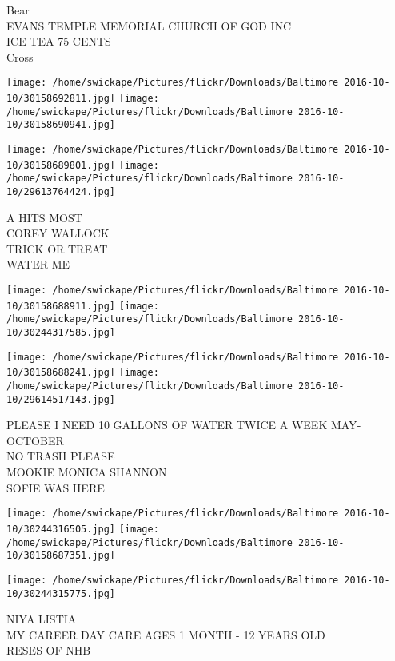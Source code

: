 \documentclass[10pt,letterpaper]{article}
\begin{document}
Bear\\
EVANS TEMPLE MEMORIAL CHURCH OF GOD INC\\
ICE TEA 75 CENTS\\
Cross\\
\pagebreak

\texttt{[image: /home/swickape/Pictures/flickr/Downloads/Baltimore 2016-10-10/30158692811.jpg]}
\texttt{[image: /home/swickape/Pictures/flickr/Downloads/Baltimore 2016-10-10/30158690941.jpg]}

\texttt{[image: /home/swickape/Pictures/flickr/Downloads/Baltimore 2016-10-10/30158689801.jpg]}
\texttt{[image: /home/swickape/Pictures/flickr/Downloads/Baltimore 2016-10-10/29613764424.jpg]}

A HITS MOST\\
COREY WALLOCK\\
TRICK OR TREAT\\
WATER ME\\
\pagebreak

\texttt{[image: /home/swickape/Pictures/flickr/Downloads/Baltimore 2016-10-10/30158688911.jpg]}
\texttt{[image: /home/swickape/Pictures/flickr/Downloads/Baltimore 2016-10-10/30244317585.jpg]}

\texttt{[image: /home/swickape/Pictures/flickr/Downloads/Baltimore 2016-10-10/30158688241.jpg]}
\texttt{[image: /home/swickape/Pictures/flickr/Downloads/Baltimore 2016-10-10/29614517143.jpg]}

PLEASE I NEED 10 GALLONS OF WATER TWICE A WEEK MAY{-}OCTOBER\\
NO TRASH PLEASE\\
MOOKIE MONICA SHANNON\\
SOFIE WAS HERE\\
\pagebreak

\texttt{[image: /home/swickape/Pictures/flickr/Downloads/Baltimore 2016-10-10/30244316505.jpg]}
\texttt{[image: /home/swickape/Pictures/flickr/Downloads/Baltimore 2016-10-10/30158687351.jpg]}

\texttt{[image: /home/swickape/Pictures/flickr/Downloads/Baltimore 2016-10-10/30244315775.jpg]}

NIYA LISTIA\\
MY CAREER DAY CARE AGES 1 MONTH {-} 12 YEARS OLD\\
RESES OF NHB\\
\pagebreak
\end{document}
